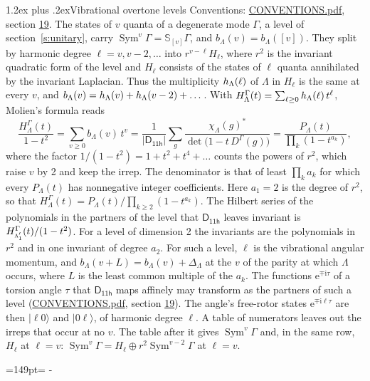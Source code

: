 \documentclass[10pt,a4paper]{article}
\makeatletter
\renewcommand\section{\@startsection{section}{1}{\z@}{-3ex plus -1ex minus -.2ex}%
  {1.2ex plus .2ex}{\normalfont\large\sffamily\bfseries\color{parttitle}}}
\newcommand{\needspace}[1]{\par\penalty-100\begingroup\dimen0=#1\relax\dimen2=\pagegoal
  \advance\dimen2-\pagetotal\ifdim\dimen0>\dimen2\relax\ifdim\dimen2>0pt\vfil\break\fi\fi
  \endgroup}
\numberwithin{equation}{section}
\newcommand{\grp}[1]{\mathsf{#1}}
\newcommand{\irr}[1]{\text{\normalfont\scshape #1}}
\newcommand{\iunit}{\mathrm{i}}
\newcommand{\expe}{\mathrm{e}}
\newcommand{\repD}[1]{D^{#1}}
\newcommand{\irchar}[1]{\chi_{#1}}
\newcommand{\conj}[1]{{#1}^{*}}
\newcommand{\schur}[1]{\mathbb{S}_{#1}}
\newcommand{\shape}[1]{[#1]}
\newcommand{\occ}[1]{\lvert #1\rangle}
\makeatother
\begin{document}
\section{Vibrational overtone levels}\label{s:overtones}
Conventions: \href{../../CONVENTIONS.pdf}{CONVENTIONS.pdf}, section \href{../../CONVENTIONS.pdf\#conv.19}{19}.
\leavevmode\label{n:index.quanta}\label{n:operator.symmetric.power}The states of $v$ quanta of a degenerate mode $\Gamma$, a level of section~\ref{s:unitary}, carry $\operatorname{Sym}^{v}\Gamma = \schur{\shape{v}}\Gamma$, and $b_\Lambda(v) = b_\Lambda(\shape{v})$. \label{n:local.quadratic.form}\label{n:set.harmonic}They split by harmonic degree $\ell = v, v - 2, \dots$ into $r^{v-\ell}H_\ell$, where $r^2$ is the invariant quadratic form of the level and $H_\ell$ consists of the states of $\ell$ quanta annihilated by the invariant Laplacian. \label{n:function.multiplicity.harmonic}Thus the multiplicity $\mathnormal{h}_\Lambda(\ell)$ of $\Lambda$ in $H_\ell$ is the same at every $v$, and $b_\Lambda(v) = \mathnormal{h}_\Lambda(v) + \mathnormal{h}_\Lambda(v - 2) + \dots$. \label{n:function.generating.level}With $H^{\Gamma}_\Lambda(t) = \sum_{\ell\ge0} \mathnormal{h}_\Lambda(\ell)\,t^{\ell}$, Molien's formula reads
\begin{equation}\label{e:molien}\frac{H^{\Gamma}_\Lambda(t)}{1 - t^2} = \sum_{v\ge0} b_\Lambda(v)\,t^v = \frac{1}{|\grp{D_{11h}}|}\sum_{g}\frac{\conj{\irchar{\Lambda}(g)}}{\det\bigl(1 - t\,\repD{\Gamma}(g)\bigr)} = \frac{P_\Lambda(t)}{\prod_k (1-t^{a_k})},\end{equation}
where the factor $1/(1 - t^2) = 1 + t^2 + t^4 + \dots$ counts the powers of $r^2$, which raise $v$ by 2 and keep the irrep. The denominator is that of least $\prod_k a_k$ for which every $P_\Lambda(t)$ has nonnegative integer coefficients. Here $a_1 = 2$ is the degree of $r^2$, so that $H^{\Gamma}_\Lambda(t) = P_\Lambda(t)/\prod_{k\ge2}(1 - t^{a_k})$. The Hilbert series of the polynomials in the partners of the level that $\grp{D_{11h}}$ leaves invariant is $H^{\Gamma}_{\irr{a}_{1}'}(t)/(1 - t^2)$. For a level of dimension 2 the invariants are the polynomials in $r^2$ and in one invariant of degree $a_2$. \label{n:index.overtone.period}\label{n:index.increment.unitary}For such a level, $\ell$ is the vibrational angular momentum, and $b_\Lambda(v + L) = b_\Lambda(v) + \Delta_\Lambda$ at the $v$ of the parity at which $\Lambda$ occurs, where $L$ is the least common multiple of the $a_k$. \label{n:local.torsion.angle}The functions $\expe^{\mp\iunit\tau}$ of a torsion angle $\tau$ that $\grp{D_{11h}}$ maps affinely may transform as the partners of such a level (\href{../../CONVENTIONS.pdf}{CONVENTIONS.pdf}, section \href{../../CONVENTIONS.pdf\#conv.19}{19}). The angle's free-rotor states $\expe^{\mp\iunit\ell\tau}$ are then $\occ{\ell 0}$ and $\occ{0 \ell}$, of harmonic degree $\ell$. A table of numerators leaves out the irreps that occur at no $v$. The table after it gives $\operatorname{Sym}^{v}\Gamma$ and, in the same row, $H_\ell$ at $\ell = v$: $\operatorname{Sym}^{v}\Gamma = H_\ell \oplus r^2\operatorname{Sym}^{v-2}\Gamma$ at $\ell = v$.
\needspace{149pt}
\end{document}
